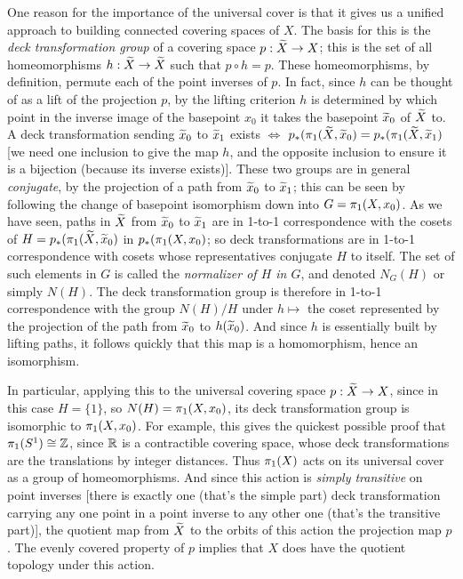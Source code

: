 One reason for the importance of the universal cover is that it gives
us a unified approach to building  connected covering
spaces of $X$. The basis for this is the {\it deck transformation group}
of a covering space $p:\widetilde{X}\rightarrow X$; this is the set of all
homeomorphisms $h:\widetilde{X}\rightarrow\widetilde{X}$ such that $p\circ h = p$.
These homeomorphisms, by definition, permute each of the point inverses
of $p$. In fact, since $h$ can be thought of as a lift of the projection
$p$, by the lifting criterion $h$ is determined by which point in the 
inverse image of the basepoint $x_0$ it takes the basepoint 
$\widetilde{x}_0$ of $\widetilde{X}$ to. A deck transformation sending
$\widetilde{x}_0$ to $\widetilde{x}_1$ exists $\Leftrightarrow$
$p_*(\pi_1(\widetilde{X},\widetilde{x}_0)=p_*(\pi_1(\widetilde{X},\widetilde{x}_1)$
[we need one inclusion to give the map $h$, and the opposite inclusion
to ensure it is a bijection (because its inverse exists)]. These two groups
are in general {\it conjugate}, by the projection of a path from 
$\widetilde{x}_0$ to $\widetilde{x}_1$; this can be seen by following the change
of basepoint isomorphism down into $G=\pi_1(X,x_0)$. As we have seen, paths
in $\widetilde{X}$ from $\widetilde{x}_0$ to $\widetilde{x}_1$ are in 1-to-1
correspondence with the cosets of $H=p_*(\pi_1(\widetilde{X},\widetilde{x}_0)$ in 
$p_*(\pi_1({X},{x}_0)$; so deck transformations are in 1-to-1 
correspondence with cosets whose representatives conjugate 
$H$ to itself. The set of such elements in $G$ is called the 
{\it normalizer of $H$ in $G$}, and denoted $N_G(H)$ or simply
$N(H)$. The deck transformation group is therefore
in 1-to-1 correspondence with the group $N(H)/H$ under
$h\mapsto$ the coset represented by the projection of the path from 
$\widetilde{x}_0$ to $h(\widetilde{x}_0)$. And since $h$ is essentially built
by lifting paths, it follows quickly that this map is a
homomorphism, hence an isomorphism.

\msk

In particular, applying this to the universal covering space
$p:\widetilde{X}\rightarrow X$, since in this case $H=\{1\}$, so $N(H)=\pi_1(X,x_0)$,
its deck transformation group is isomorphic to $\pi_1(X,x_0)$. 
For example, this gives the quickest possible proof 
that $\pi_1(S^1)\cong {\Bbb Z}$, since ${\Bbb R}$ is a 
contractible covering space, whose deck transformations
are the translations by integer distances. 
Thus $\pi_1(X)$ acts on its universal cover as a group of
homeomorphisms. And since this action is {\it simply transitive}
on point inverses [there is exactly one (that's the simple
part) deck transformation carrying any one point in a point 
inverse to any other one (that's the transitive part)], the 
quotient map from $\widetilde{X}$ to the orbits of this action 
the projection map $p$. The evenly covered property of $p$ implies
that $X$ does have the quotient topology under this action.

